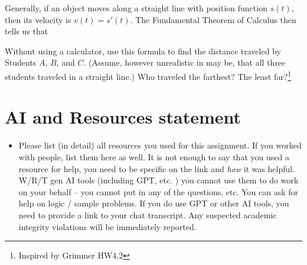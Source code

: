 \documentclass[
]{article}
\providecommand{\tightlist}{%
  \setlength{\itemsep}{0pt}\setlength{\parskip}{0pt}}
\begin{document}
Generally, if an object moves along a straight line with position
function \(s(t)\), then its velocity is \(v(t) = s'(t)\). The
Fundamental Theorem of Calculus then tells us that

Without using a calculator, use this formula to find the distance
traveled by Students \(A\), \(B\), and \(C\). (Assume, however
unrealistic in may be, that all three students traveled in a straight
line.) Who traveled the farthest? The least far?\footnote{Inspired by
  Grimmer HW4.2}

\section{AI and Resources statement}\label{ai-and-resources-statement}

\begin{itemize}
\tightlist
\item
  Please list (in detail) all resources you used for this assignment. If
  you worked with people, list them here as well. It is not enough to
  say that you used a resource for help, you need to be specific on the
  link and \emph{how} it was helpful. W/R/T gen AI tools (including GPT,
  etc. ) you cannot use them to do work on your behalf -- you cannot put
  in any of the questions, etc. You can ask for help on logic / sample
  problems. If you do use GPT or other AI tools, you need to provide a
  link to your chat transcript. Any suspected academic integrity
  violations will be immediately reported.
\end{itemize}
\end{document}
